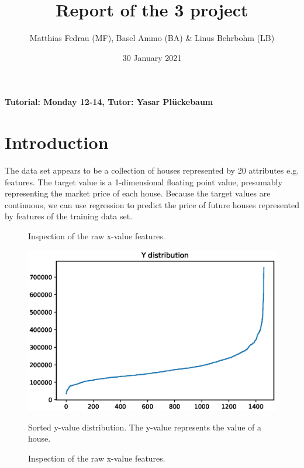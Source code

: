 \documentclass[a4paper,12pt]{article}
\title{Report of the 3\ts{rd} project}
\author{Matthias Fedrau (MF), Basel Ammo (BA) \& Linus Behrbohm (LB)}
\date{30\ts{th} January 2021}
\newcommand{\initials}[1]{\marginpar{\quad\texttt{#1}}}
\begin{document}

\pagestyle{myheadings}
    
\maketitle

\begin{center}
    \textbf{Tutorial: Monday 12-14, Tutor: Yasar Plückebaum}
\end{center}
\newpage

\section{Introduction}
\initials{LB}

The data set appears to be a collection of houses represented by 20 attributes e.g. features. The target value is a 1-dimensional floating point value, presumably representing the market price of each house. Because the target values are continuous, we can use regression to predict the price of future houses represented by features of the training data set.

\begin{figure}[!h]
\centering
\begin{minipage}{.3\textwidth}
\resizebox{.6\width}{!}{}
\caption{Inspection of the raw x-value features.}
\end{minipage}
\hfill
\begin{minipage}{.5\textwidth}
\begin{minipage}{1\textwidth}
\includegraphics[width=1\textwidth]{plots/y_distribution}
\caption{Sorted y-value distribution. The y-value represents the value of a house.}
\end{minipage}

\vspace{10pt}
\begin{minipage}{1\textwidth}
\resizebox{.6\width}{!}{}
\caption{Inspection of the raw x-value features.}
\end{minipage}
\end{minipage}
\label{fig_res}
\end{figure}
\end{document}
